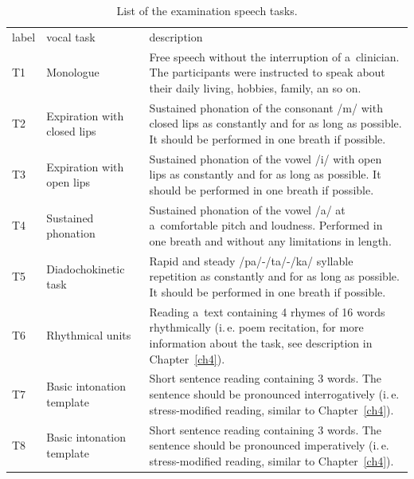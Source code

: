 \begin{table}[htb!]
	\centering
	\begin{threeparttable}
		\caption{List of the examination speech tasks.}
		\label{tab:ch6_speech_tasks}
		\footnotesize
		\centering
		\begin{tabularx}{1.00\textwidth}{l l X}

			\hline\hline\noalign{\smallskip}
			\rowcolor{gray_table}
			label & vocal task & description \\
			\noalign{\smallskip}\hline\noalign{\smallskip}

			T1 & 
			Monologue & 
			Free speech without the interruption of a~clinician. The participants were instructed to speak about their daily living, hobbies, family, an so on. \\
			
			T2 & 
			Expiration with closed lips & 
			Sustained phonation of the consonant /m/ with closed lips as constantly and for as long as possible. It should be performed in one breath if possible. \\
			
			T3 & 
			Expiration with open lips & 
			Sustained phonation of the vowel /i/ with open lips as constantly and for as long as possible. It should be performed in one breath if possible. \\
			
			T4 & 
			Sustained phonation & 
			Sustained phonation of the vowel /a/ at a~comfortable pitch and loudness. Performed in one breath and without any limitations in length. \\
			
			T5 & 
			Diadochokinetic task & 
			Rapid and steady /pa/-/ta/-/ka/ syllable repetition as constantly and for as long as possible. It should be performed in one breath if possible. \\
			
			T6 & 
			Rhythmical units & 
			Reading a~text containing 4 rhymes of 16 words rhythmically (i.\,e. poem recitation, for more information about the task, see description in Chapter~\ref{ch4}). \\
			
			T7 & 
			Basic intonation template & 
			Short sentence reading containing 3 words. The sentence should be pronounced interrogatively (i.\,e. stress-modified reading, similar to Chapter~\ref{ch4}). \\
			
			T8 & 
			Basic intonation template & 
			Short sentence reading containing 3 words. The sentence should be pronounced imperatively (i.\,e. stress-modified reading, similar to Chapter~\ref{ch4}). \\
			

\end{tabularx}
\end{threeparttable}
\end{table}
